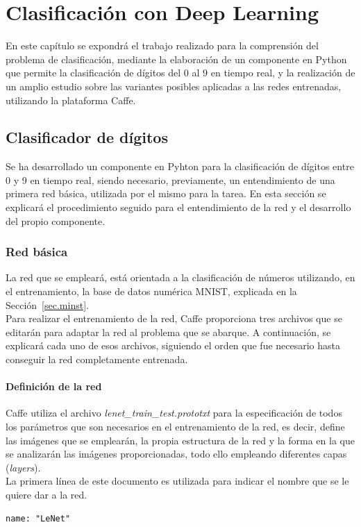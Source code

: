 \chapter{Clasificación con Deep Learning}\label{cap.clasificacion}
En este capítulo se expondrá el trabajo realizado para la comprensión del problema de clasificación, mediante la elaboración de un componente en Python que permite la clasificación de dígitos del 0 al 9 en tiempo real, y la realización de un amplio estudio sobre las variantes posibles aplicadas a las redes entrenadas, utilizando la plataforma Caffe.
\section{Clasificador de dígitos}
Se ha desarrollado un componente en Pyhton para la clasificación de dígitos entre 0 y 9 en tiempo real, siendo necesario, previamente, un entendimiento de una primera red básica, utilizada por el mismo para la tarea. En esta sección se explicará el procedimiento seguido para el entendimiento de la red y el desarrollo del propio componente.
\subsection{Red básica}\label{sec.red}
La red que se empleará, está orientada a la clasificación de números utilizando, en el entrenamiento, la base de datos numérica MNIST, explicada en la Sección~\ref{sec.minst}.\\
Para realizar el entrenamiento de la red, Caffe proporciona tres archivos que se editarán para adaptar la red al problema que se abarque. A continuación, se explicará cada uno de esos archivos, siguiendo el orden que fue necesario hasta conseguir la red completamente entrenada.
\vspace{15pt}
\subsubsection{Definición de la red}
	Caffe utiliza el archivo 
	\textit{lenet\_train\_test.prototxt} para la especificación de todos los parámetros que son necesarios en el entrenamiento de la red, es decir, define las imágenes que se emplearán, la propia estructura de la red y la forma en la que se analizarán las imágenes proporcionadas, todo ello empleando diferentes capas (\textit{layers}).\\

	La primera línea de este documento es utilizada para indicar el nombre que se le quiere dar a la red.
	\vspace{10pt}
	\begin{lstlisting}[frame=single]
	name: "LeNet"
	\end{lstlisting}
	
